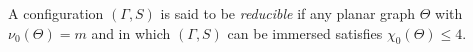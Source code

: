 A configuration $(\Gamma, S)$ is said to be \textit{reducible} if any planar graph $\Theta$ with $\nu_0(\Theta) = m$ and in which $(\Gamma, S)$ can be immersed satisfies $\chi_0(\Theta) \leq 4$.

